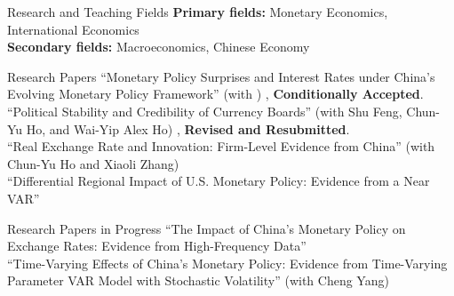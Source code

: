 \documentclass{resume_liang} %
\begin{document}
\begin{rSection}{Research and Teaching Fields}
{\bf Primary fields:} Monetary Economics, International Economics 
\vspace{0.1cm} \\ 
{\bf Secondary fields:} Macroeconomics, Chinese Economy 
\end{rSection}
\bigskip  




\begin{rSection}{Research Papers}
``Monetary Policy Surprises and Interest Rates under China's Evolving Monetary Policy Framework'' (with \href{https://sites.google.com/site/chunyuho}{\color{black}{Chun-Yu Ho}}) \textit{}, \textbf{Conditionally Accepted}.
\vspace{0.1cm} \\
``Political Stability and Credibility of Currency Boards'' (with Shu Feng, Chun-Yu Ho, and Wai-Yip Alex Ho)  \textit{}, \textbf{Revised and Resubmitted}.
\vspace{0.1cm} \\
``Real Exchange Rate and Innovation: Firm-Level Evidence from China'' (with Chun-Yu Ho and Xiaoli Zhang) 
\vspace{0.1cm} \\
``Differential Regional Impact of U.S. Monetary Policy: Evidence from a Near VAR''
\end{rSection}
\bigskip  




\begin{rSection}{Research Papers in Progress}
``The Impact of China's Monetary Policy on Exchange Rates: Evidence from High-Frequency Data''
\vspace{0.1cm}\\
``Time-Varying Effects of China's Monetary Policy: Evidence from Time-Varying Parameter VAR Model with Stochastic Volatility'' (with Cheng Yang)
\end{rSection}
\bigskip  
\end{document}
